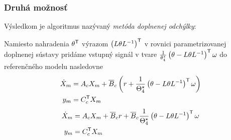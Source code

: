﻿\documentclass[a4paper, 10pt, ]{article}
\begin{document}
\subsubsection{Druhá možnosť}

Výsledkom je algoritmus nazývaný \emph{metóda doplnenej odchýlky}:

Namiesto nahradenia $\theta^{\mathsf{T}}$ výrazom $\left( L \theta L^{-1} \right)^{\mathsf{T}}$ v rovnici parametrizovanej doplnenej sústavy pridáme vstupný signál v tvare $\frac{1}{\theta_4^\star} \left( \theta - L \theta L^{-1} \right)^{\mathsf{T}} \omega$ do referenčného modelu nasledovne
\begin{subequations} \label{vvMRAC_NeminRefModelPrid}
	\begin{align}
		\dot{X}_m
		&=
		A_c
		X_m
		+
		\overline{B}_c
		\left(
			r
			+
			\frac{1}{\Theta_4^\star}
			\left(
			\theta
			-
			L
			\theta
			L^{-1}
			\right)^{\mathsf{T}}
			\omega
		\right)
		\\
		y_m
		&=
		C_c^{\mathsf{T}}
		X_m
	\end{align}
\end{subequations}
\begin{subequations} \label{vvMRAC_NeminRefModelPrid02}
	\begin{align}
		\dot{X}_m
		&=
		A_c
		X_m
		+
		\overline{B}_c
			r
			+
			\overline{B}_c
			\frac{1}{\Theta_4^\star}
			\left(
				\theta
				-
				L
				\theta
				L^{-1}
			\right)^{\mathsf{T}}
		\omega
		\\
		y_m
		&=
		C_c^{\mathsf{T}}
		X_m
	\end{align}
\end{subequations}
\end{document}
